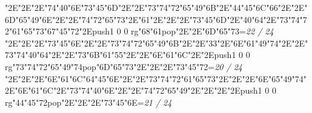 \null\vfill\quad\quad\quad\ipa\char"2E\quad\quad\quad\quad\ipa\char"2E\quad\ipa\char"2E\ipa\char"74\ipa\char"40\ipa\char"6E\bigskip\ipa\char"73\ipa\char"45\ipa\char"6D\ipa\char"2E\quad\quad\quad\ipa\char"2E\ipa\char"73\ipa\char"74\ipa\char"72\ipa\char"65\ipa\char"49\ipa\char"6B\bigskip\quad\quad\ipa\char"2E\ipa\char"44\ipa\char"45\ipa\char"6C\ipa\char"66\ipa\char"2E\quad\ipa\char"2E\ipa\char"6D\ipa\char"65\ipa\char"49\ipa\char"6E\ipa\char"2E\quad\quad\quad\ipa\char"2E\ipa\char"74\ipa\char"72\ipa\char"65\ipa\char"73\ipa\char"2E\quad\quad\quad\bigskip\ipa\char"61\ipa\char"2E\quad\quad\quad\quad\ipa\char"2E\quad\quad\ipa\char"2E\ipa\char"73\ipa\char"45\ipa\char"6D\ipa\char"2E\ipa\char"40\ipa\char"64\ipa\char"2E\ipa\char"73\ipa\char"74\ipa\char"72\ipa\char"61\ipa\char"65\ipa\char"73\bigskip\ipa\char"67\ipa\char"45\ipa\char"72\ipa\char"2E\pdfcolorstack\match push{1 0 0 rg}\ipa\char"68\ipa\char"61\pdfcolorstack\match pop{}\ipa\char"2E\quad\quad\quad\ipa\char"2E\ipa\char"6D\ipa\char"65\ipa\char"73\bigskip\vfill\footline={\hfill\tenrm\it 22 / 24}\eject
\null\vfill\quad\quad\quad\ipa\char"2E\quad\quad\quad\quad\ipa\char"2E\quad\ipa\char"2E\quad\quad\quad\bigskip\ipa\char"73\ipa\char"45\ipa\char"6E\ipa\char"2E\quad\quad\quad\ipa\char"2E\ipa\char"73\ipa\char"74\ipa\char"72\ipa\char"65\ipa\char"49\ipa\char"6B\bigskip\quad\quad\ipa\char"2E\quad\quad\quad\quad\ipa\char"2E\ipa\char"33\ipa\char"2E\ipa\char"6E\ipa\char"61\ipa\char"49\ipa\char"74\ipa\char"2E\quad\quad\quad\ipa\char"2E\ipa\char"73\ipa\char"74\ipa\char"40\ipa\char"64\ipa\char"2E\quad\quad\quad\bigskip\quad\ipa\char"2E\ipa\char"73\ipa\char"6B\ipa\char"61\ipa\char"55\ipa\char"2E\quad\quad\ipa\char"2E\ipa\char"6E\ipa\char"61\ipa\char"6C\ipa\char"2E\quad\quad\ipa\char"2E\pdfcolorstack\match push{1 0 0 rg}\ipa\char"73\ipa\char"74\ipa\char"72\ipa\char"65\ipa\char"49\ipa\char"74\pdfcolorstack\match pop{}\bigskip\ipa\char"6D\ipa\char"65\ipa\char"73\ipa\char"2E\quad\quad\ipa\char"2E\quad\quad\quad\ipa\char"2E\ipa\char"73\ipa\char"45\ipa\char"72\bigskip\vfill\footline={\hfill\tenrm\it 20 / 24}\eject
\null\vfill\quad\quad\quad\ipa\char"2E\quad\quad\quad\quad\ipa\char"2E\quad\ipa\char"2E\ipa\char"6E\ipa\char"61\ipa\char"6C\bigskip\ipa\char"64\ipa\char"45\ipa\char"6E\ipa\char"2E\quad\quad\quad\ipa\char"2E\ipa\char"73\ipa\char"74\ipa\char"72\ipa\char"61\ipa\char"65\ipa\char"73\bigskip\quad\quad\ipa\char"2E\quad\quad\quad\quad\ipa\char"2E\quad\ipa\char"2E\ipa\char"6E\ipa\char"65\ipa\char"49\ipa\char"74\ipa\char"2E\ipa\char"6E\ipa\char"61\ipa\char"6C\ipa\char"2E\ipa\char"73\ipa\char"74\ipa\char"40\ipa\char"6E\ipa\char"2E\quad\quad\quad\bigskip\quad\ipa\char"2E\ipa\char"74\ipa\char"72\ipa\char"65\ipa\char"49\ipa\char"2E\quad\quad\ipa\char"2E\quad\quad\quad\ipa\char"2E\quad\quad\ipa\char"2E\quad\quad\quad\quad\quad\quad\bigskip\pdfcolorstack\match push{1 0 0 rg}\ipa\char"44\ipa\char"45\ipa\char"72\pdfcolorstack\match pop{}\ipa\char"2E\quad\quad\ipa\char"2E\quad\quad\quad\ipa\char"2E\ipa\char"73\ipa\char"45\ipa\char"6E\bigskip\vfill\footline={\hfill\tenrm\it 21 / 24}\eject
